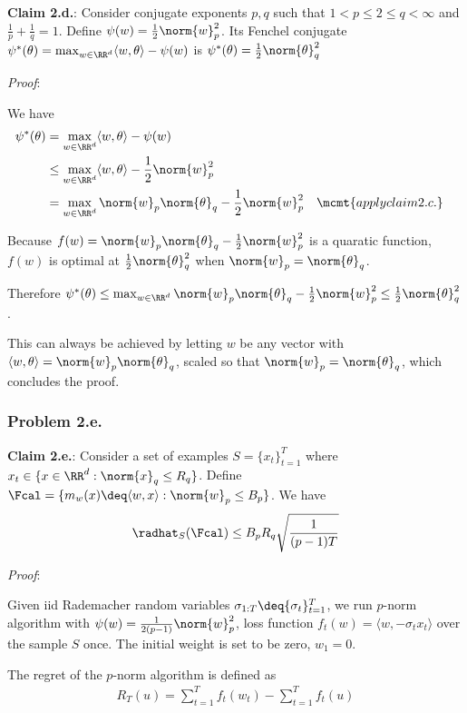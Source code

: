 \textbf{Claim 2.d.}: Consider conjugate exponents $p, q$ such that $1 < p \le 2 \le q < \infty$ and $\frac{1}{p} + \frac{1}{q} = 1$. Define $\psi(w) = \frac{1}{2}\norm{w}_p^2$. Its Fenchel conjugate $\psi^*(\theta) = \max_{w \in \RR^d} \langle w, \theta \rangle - \psi(w)$ is $\psi^*(\theta) = \frac{1}{2}\norm{ \theta }_q^2$

\textit{Proof}:

We have
\begin{align*}
  \psi^*(\theta)
  &= \max_{w \in \RR^d} \langle w, \theta \rangle - \psi(w) \\
  &\le \max_{w \in \RR^d} \langle w, \theta \rangle - \frac{1}{2}\norm{w}_p^2 \\
  &= \max_{w \in \RR^d} \norm{w}_p\norm{\theta}_q - \frac{1}{2}\norm{w}_p^2 && \mcmt{apply claim 2.c.}
\end{align*}

Because $f(w) = \norm{w}_p\norm{ \theta }_q - \frac{1}{2}\norm{w}_p^2$ is a quaratic function, $f(w)$ is optimal at $\frac{1}{2} \norm{\theta}_q^2$ when $\norm{w}_p = \norm{ \theta }_q$.

Therefore $\psi^*(\theta) \le \max_{w \in \RR^d} \norm{w}_p\norm{\theta}_q - \frac{1}{2}\norm{w}_p^2 \le \frac{1}{2} \norm{\theta}_q^2$.

This can always be achieved by letting $w$ be any vector with $\langle w, \theta \rangle = \norm{w}_p \norm{\theta}_q$, scaled so that $\norm{w}_p = \norm{\theta}_q$, which concludes the proof.

\subsubsection*{Problem 2.e.}

\textbf{Claim 2.e.}: Consider a set of examples $S = \{x_t\}_{t=1}^T$ where $ x_t \in \{x \in \RR^d: \norm{x}_q \le R_q\}$. Define $\Fcal = \{m_w(x) \deq \langle w,x \rangle : \norm{w}_p \le B_p\}$. We have
\begin{align*}
  \radhat_S(\Fcal) \le B_pR_q\sqrt{\frac{1}{(p-1)T}}
\end{align*}

\textit{Proof}:

Given iid Rademacher random variables $\sigma_{1:T} \deq \{\sigma_t\}_{t=1}^T$, we run $p$-norm algorithm with $\psi(w) = \frac{1}{2(p-1)} \norm{w}_p^2$, loss function $f_t(w) = \langle w, -\sigma_t x_t \rangle$ over the sample $S$ once. The initial weight is set to be zero, $w_1 = 0$.

The regret of the $p$-norm algorithm is defined as 
\begin{align*}
  R_T(u) = \sum_{t=1}^Tf_t(w_t) - \sum_{t=1}^T f_t(u)
\end{align*}

